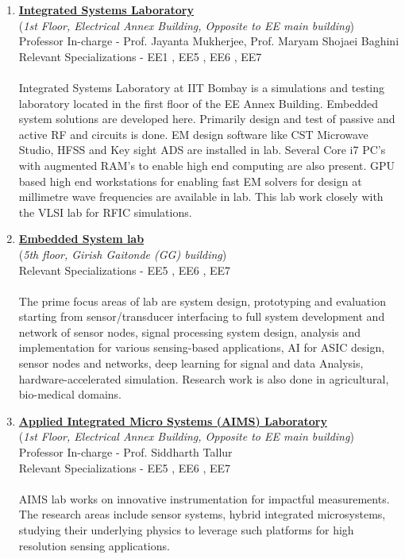 \documentclass[openany]{book} %
\begin{document}
\begin{enumerate}
\item \href{https://www.ee.iitb.ac.in/web/research/labs/isl} {\color{blue} \textbf{Integrated Systems Laboratory}}\\
    (\textit{1st Floor, Electrical Annex Building, Opposite to EE main building})\\
    Professor In-charge - Prof. Jayanta Mukherjee, Prof. Maryam Shojaei Baghini\\
Relevant Specializations - EE1 , EE5 , EE6 , EE7\\
\\
Integrated Systems Laboratory at IIT Bombay is a simulations and testing laboratory located in the first floor of the EE Annex Building. Embedded system solutions are developed here. Primarily design and test of passive and active RF and circuits is done. EM design software like CST Microwave Studio, HFSS and Key sight ADS are installed in lab. Several Core i7 PC's with augmented RAM's to enable high end computing are also present. GPU based high end workstations for enabling fast EM solvers for design at millimetre wave frequencies are available in lab. This lab work closely with the VLSI lab for RFIC simulations.\\


\item \href{https://www.ee.iitb.ac.in/web/research/labs/emsys} {\color{blue} \textbf{Embedded System lab}}\\
    (\textit{5th floor, Girish Gaitonde (GG) building})\\
Relevant Specializations - EE5 , EE6 , EE7\\
\\
The prime focus areas of lab are system design, prototyping and evaluation starting from sensor/transducer interfacing to full system development and network of sensor nodes, signal processing system design, analysis and implementation for various sensing-based applications, AI for ASIC design, sensor nodes and networks, deep learning for signal and data Analysis, hardware-accelerated simulation. Research work is also done in agricultural, bio-medical domains.\\

\item \href{http://www.ee.iitb.ac.in/~stallur/index.php/} {\color{blue} \textbf{Applied Integrated Micro Systems (AIMS) Laboratory}}\\
    (\textit{1st Floor, Electrical Annex Building, Opposite to EE main building})\\
    Professor In-charge - Prof. Siddharth Tallur\\
Relevant Specializations - EE5 , EE6 , EE7\\
\\
AIMS lab works on  innovative instrumentation for impactful measurements. The research areas include sensor systems, hybrid integrated microsystems,  studying their underlying physics  to leverage such platforms for high resolution sensing applications.\\


\end{enumerate}
\end{document}
